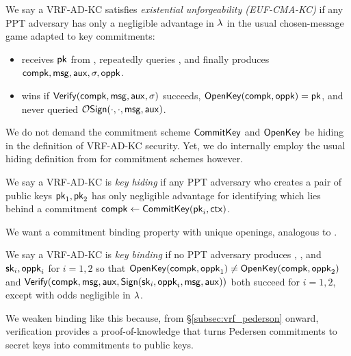 \begin{definition}
We say a VRF-AD-KC satisfies {\em existential unforgeability (EUF-CMA-KC)} if
any PPT adversary \adv has only a negligible advantage in $\lambda$
in the usual chosen-message game adapted to key commitments:
\begin{itemize}
 \item \adv receives $\mathsf{pk}$ from , %
 repeatedly queries ,
  and finally produces $\mathsf{compk},\mathsf{msg},\mathsf{aux},\sigma,\mathsf{oppk}$.
 \item \adv wins if ${\mathsf{Verify}}(\mathsf{compk},\mathsf{msg},\mathsf{aux},\sigma)$ succeeds,
  ${\mathsf{OpenKey}}(\mathsf{compk},\mathsf{oppk}) = \mathsf{pk}$, and
   \adv never queried $\mathcal{O}\mathsf{Sign}(\cdot,\cdot,\mathsf{msg},\mathsf{aux})$.
\end{itemize}
\end{definition}

We do not demand the commitment scheme ${\mathsf{CommitKey}}$ and ${\mathsf{OpenKey}}$
be hiding in the definition of VRF-AD-KC security.
Yet, we do internally employ the usual hiding definition from
\cite[pp.8]{cryptoeprint:2019:1185} for commitment schemes however.

\begin{definition}
We say a VRF-AD-KC is {\em key hiding} if any PPT adversary \adv
who creates a pair of public keys $\mathsf{pk}_1,\mathsf{pk}_2$
has only negligible advantage for identifying which lies behind a commitment
 $\mathsf{compk} \leftarrow {\ensuremath{\mathsf{CommitKey}}}(\mathsf{pk}_i,\mathsf{ctx})$.
\end{definition}

We want a commitment binding property with unique openings,
analogous to \cite[pp.9]{cryptoeprint:2019:1185}.

\begin{definition}\label{def:vrf_key_binding}
We say a VRF-AD-KC is {\em key binding} if no PPT adversary \adv
produces \compk, \msg, \aux and $\mathsf{sk}_i,\mathsf{oppk}_i$ for $i=1,2$
so that
 ${\mathsf{OpenKey}}(\mathsf{compk},\mathsf{oppk}_1) \ne {\ensuremath{\mathsf{OpenKey}}}(\mathsf{compk},\mathsf{oppk}_2)$ and
 ${\mathsf{Verify}}(\mathsf{compk},\mathsf{msg},\mathsf{aux},{\mathsf{Sign}}(\mathsf{sk}_i,\mathsf{oppk}_i,\mathsf{msg},\mathsf{aux}))$
both succeed for $i=1,2$, except with odds negligible in $\lambda$.
\end{definition}

We weaken binding like this because, from \S\ref{subsec:vrf_pederson}
onward, verification provides a proof-of-knowledge that turns
Pedersen commitments to secret keys into commitments to public keys.

